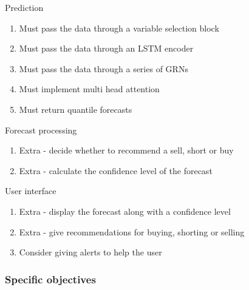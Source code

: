 \documentclass{article}
\begin{document}
Prediction
\begin{enumerate}
    \item Must pass the data through a variable selection block
    \item Must pass the data through an LSTM encoder
    \item Must pass the data through a series of GRNs
    \item Must implement multi head attention
    \item Must return quantile forecasts
\end{enumerate}

Forecast processing
\begin{enumerate}
    \item  Extra - decide whether to recommend a sell, short or buy
    \item  Extra - calculate the confidence level of the forecast
\end{enumerate}

User interface
\begin{enumerate}
    \item Extra - display the forecast along with a confidence level
    \item Extra - give recommendations for buying, shorting or selling
    \item Consider giving alerts to help the user
\end{enumerate}

\subsubsection{Specific objectives}
\end{document}
